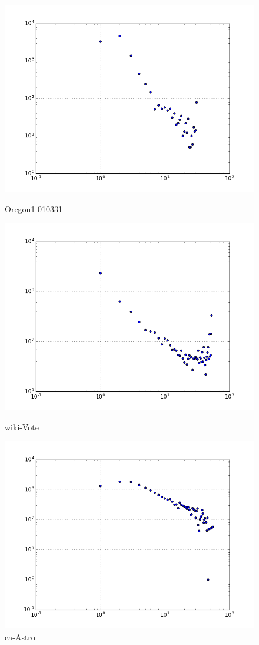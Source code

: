 \begin{figure}[H]
  \includegraphics[width=\linewidth]{img/oregon-010331/kcore_dist.png}
  \caption*{Oregon1-010331}
\endminipage\hfill
{}
  \includegraphics[width=\linewidth]{img/wiki-Vote/kcore_dist.png}
  \caption*{wiki-Vote}
\endminipage\hfill
{}
  \includegraphics[width=\linewidth]{img/ca-Astro/kcore_dist.png}
  \caption*{ca-Astro}
\endminipage
\end{figure}
